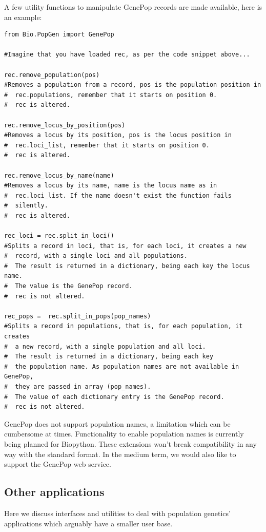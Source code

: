 \documentclass{report}
\begin{document}
A few utility functions to manipulate GenePop records are made
available, here is an example:


\begin{verbatim}
from Bio.PopGen import GenePop

#Imagine that you have loaded rec, as per the code snippet above...

rec.remove_population(pos)
#Removes a population from a record, pos is the population position in
#  rec.populations, remember that it starts on position 0.
#  rec is altered.

rec.remove_locus_by_position(pos)
#Removes a locus by its position, pos is the locus position in
#  rec.loci_list, remember that it starts on position 0.
#  rec is altered.

rec.remove_locus_by_name(name)
#Removes a locus by its name, name is the locus name as in
#  rec.loci_list. If the name doesn't exist the function fails
#  silently.
#  rec is altered.

rec_loci = rec.split_in_loci()
#Splits a record in loci, that is, for each loci, it creates a new
#  record, with a single loci and all populations.
#  The result is returned in a dictionary, being each key the locus name.
#  The value is the GenePop record.
#  rec is not altered.

rec_pops =  rec.split_in_pops(pop_names)
#Splits a record in populations, that is, for each population, it creates
#  a new record, with a single population and all loci.
#  The result is returned in a dictionary, being each key
#  the population name. As population names are not available in GenePop,
#  they are passed in array (pop_names).
#  The value of each dictionary entry is the GenePop record.
#  rec is not altered.
\end{verbatim}

GenePop does not support population names, a limitation which can be
cumbersome at times. Functionality to enable population names is currently
being planned for Biopython. These extensions won't break compatibility in
any way with the standard format.  In the medium term, we would also like to
support the GenePop web service.

\subsection{Other applications}

Here we discuss interfaces and utilities to deal with population genetics'
applications which arguably have a smaller user base.
\end{document}

